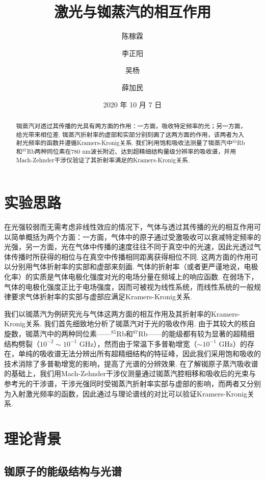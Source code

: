 \documentclass[a4paper, 10pt]{article}
\begin{document}
\title{激光与铷蒸汽的相互作用}
\author{陈稼霖\and 李正阳\and 吴杨\and 薛加民}
\date{2020 年 10 月 7 日}
\maketitle
\begin{abstract}
    铷蒸汽对透过其传播的光具有两方面的作用：一方面，吸收特定频率的光；另一方面，给光带来相位差. 铷蒸汽折射率的虚部和实部分别刻画了这两方面的作用，该两者为入射光频率的函数并遵循Kramers-Kronig关系. 我们利用饱和吸收法测量了铷蒸汽中$^{85}$Rb和$^{87}$Rb两种同位素在$780$ nm波长附近、达到超精细结构量级分辨率的吸收谱，并用Mach-Zehnder干涉仪验证了其折射率满足的Kramers-Kronig关系.
\end{abstract}

\begin{multicols*}{2}
\section{实验思路}
在光强较弱而无需考虑非线性效应的情况下，气体与透过其传播的光的相互作用可以简单概括为两个方面：一方面，气体中的原子通过受激吸收可以衰减特定频率的光强，另一方面，光在气体中传播的速度往往不同于真空中的光速，因此光透过气体传播时所获得的相位与在真空中传播相同距离获得相位不同. 这两方面的作用可以分别用气体折射率的实部和虚部来刻画. 气体的折射率（或者更严谨地说，电极化率）的实质是气体电极化强度对光的电场分量在频域上的响应函数. 在弱场下，气体的电极化强度正比于电场强度，因而可被视为线性系统，而线性系统的一般规律要求气体折射率的实部与虚部应满足Kramers-Kronig关系.

我们以铷蒸汽为例研究光与气体这两方面的相互作用及其折射率的Kramers-Kronig关系. 我们首先细致地分析了铷蒸汽对于光的吸收作用. 由于其较大的核自旋数，铷蒸汽中的两种同位素——$^{85}$Rb和$^{87}$Rb——的能级都有较为显著的超精细结构劈裂（$10^{-2}\sim 10^{-1}$ GHz），然而由于常温下多普勒增宽（$\sim 10^{-1}$ GHz）的存在，单纯的吸收谱无法分辨出所有超精细结构的特征峰，因此我们采用饱和吸收的技术消除了多普勒增宽的影响，提高了光谱的分辨效果. 在了解铷原子蒸汽吸收谱的基础上，我们用Mach-Zehnder干涉仪测量通过铷蒸汽腔相移和吸收后的光束与参考光的干涉谱，干涉光强同时受铷蒸汽折射率实部与虚部的影响，而两者又分别为入射激光频率的函数，因此通过与理论谱线的对比可以验证Kramers-Kronig关系.

\section{理论背景}

\subsection{铷原子的能级结构与光谱}


\end{multicols*}
\end{document}
